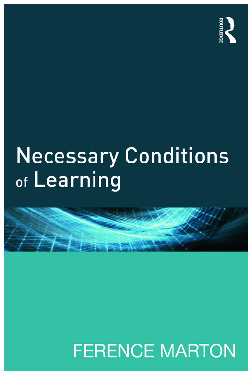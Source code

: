 \begin{frame}[fragile]
\begin{remark}
\begin{columns}[T]
\begin{column}{0.4\columnwidth}
          \includegraphics[height=0.55\textheight]{figs/NCOL.jpg}
        \end{column}
      \end{columns}
  \end{remark}
\end{frame}

